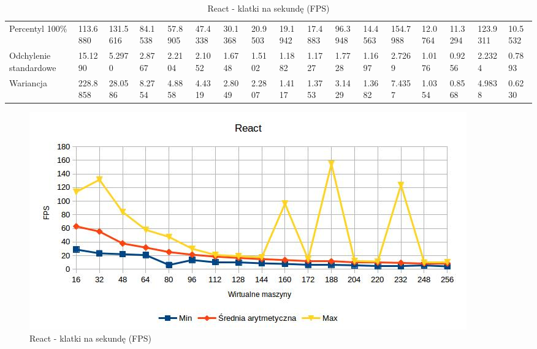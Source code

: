 \documentclass[polish, twoside, 12pt]{mwart}
\begin{document}
\begin{table}[]
{\begin{tabular}{@{}lllllllllllllllll@{}}
  Percentyl 100\%        & 113.6880 & 131.5616 & 84.1538 & 57.8905 & 47.4338 & 30.1368 & 20.9503 & 19.1942 & 17.4883 & 96.3948 & 14.4563 & 154.7988 & 12.0764 & 11.3294 & 123.9311       & 10.5532 \\
  Odchylenie standardowe & 15.1290  & 5.2970   & 2.8767  & 2.2104  & 2.1052  & 1.6748  & 1.5102  & 1.1882  & 1.1727  & 1.7728  & 1.1697  & 2.7269   & 1.0176  & 0.9256  & 2.2324         & 0.7893  \\
  Wariancja              & 228.8858 & 28.0586  & 8.2754  & 4.8858  & 4.4319  & 2.8049  & 2.2807  & 1.4117  & 1.3753  & 3.1429  & 1.3682  & 7.4357   & 1.0354  & 0.8568  & 4.9838         & 0.6230  \\ \bottomrule
  \end{tabular}%
  }
  \caption{React - klatki na sekundę (FPS)}
\end{table}

\begin{figure}[ht]
  \includegraphics[width=\textwidth]{react-fps.jpg}
	\caption{React - klatki na sekundę (FPS)}
\end{figure}
\end{document}
